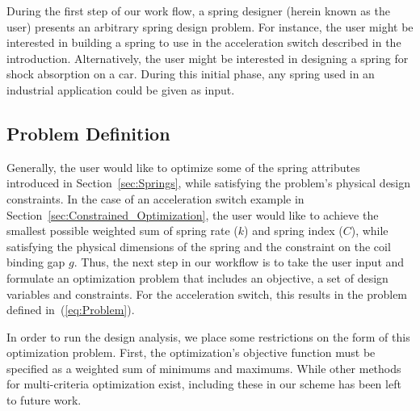 \documentclass[10pt]{article}
\begin{document}
During the first step of our work flow, a spring designer (herein known as the user) presents an arbitrary spring design problem. For instance, the user might be interested in building a spring to use in the acceleration switch described in the introduction. Alternatively, the user might be interested in designing a spring for shock absorption on a car. During this initial phase, any spring used in an industrial application could be given as input.

\subsection{Problem Definition}
\label{sec:Problem_Definition}

Generally, the user would like to optimize some of the spring attributes introduced in Section~\ref{sec:Springs}, while satisfying the problem's physical design constraints. In the case of an acceleration switch example in Section~\ref{sec:Constrained_Optimization}, the user would like to achieve the smallest possible weighted sum of spring rate ($k$) and spring index ($C$), while satisfying the physical dimensions of the spring and the constraint on the coil binding gap $g$. Thus, the next step in our workflow is to take the user input and formulate an optimization problem that includes an objective, a set of design variables and constraints. For the acceleration switch, this results in the problem defined in~(\ref{eq:Problem}). 

In order to run the design analysis, we place some restrictions on the form of this optimization problem. First, the optimization's objective function must be specified as a weighted sum of minimums and maximums. While other methods for multi-criteria optimization exist, including these in our scheme has been left to future work.
\end{document}
